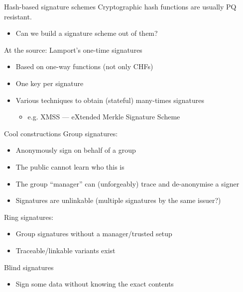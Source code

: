 \begin{frame}{Hash-based signature schemes}
  \pause
  Cryptographic hash functions are usually PQ resistant.
  \begin{itemize}
    \item Can we build a signature scheme out of them?
  \end{itemize}

  \vspace*{1em}

  \pause
  At the source: Lamport's one-time signatures
  \begin{itemize}[<+(1)->]
    \item Based on one-way functions (not only CHFs)
    \item One key per signature
    \item Various techniques to obtain (stateful) many-times signatures
    \begin{itemize}
      \item e.g. XMSS --- eXtended Merkle Signature Scheme
    \end{itemize}
  \end{itemize}
\end{frame}

\begin{frame}{Cool constructions}
  \pause
  Group signatures:
  \begin{itemize}
    \item Anonymously sign on behalf of a group
    \item The public cannot learn who this is
    \item The group \enquote{manager} can (unforgeably) trace and de-anonymise a signer
    \item Signatures are unlinkable (multiple signatures by the same issuer?)
  \end{itemize}

  \pause
  Ring signatures:
  \begin{itemize}
    \item Group signatures without a manager/trusted setup
    \item Traceable/linkable variants exist
  \end{itemize}

  \pause
  Blind signatures
  \begin{itemize}
    \item Sign some data without knowing the exact contents
  \end{itemize}
\end{frame}

